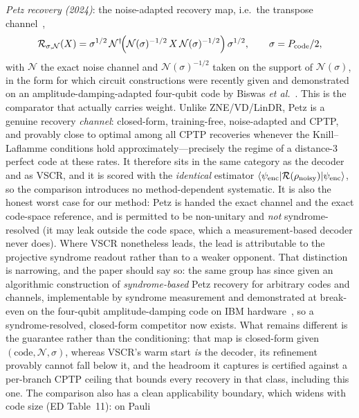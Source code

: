 \documentclass[aps,prxquantum,reprint,superscriptaddress]{revtex4-2}
\newcommand{\ket}[1]{\lvert #1\rangle}
\newcommand{\bra}[1]{\langle #1\rvert}
\begin{document}
\emph{Petz recovery (2024)}: the noise-adapted recovery map, i.e.\ the transpose
channel~\cite{petz_map,beny_optimal},
\begin{equation}
\mathcal{R}_{\sigma,\mathcal N}(X)=\sigma^{1/2}\,
\mathcal N^\dagger\!\Big(\mathcal N(\sigma)^{-1/2}\,X\,
\mathcal N(\sigma)^{-1/2}\Big)\,\sigma^{1/2},
\qquad \sigma=P_{\rm code}/2,
\label{eq:petz}
\end{equation}
with $\mathcal N$ the exact noise channel and $\mathcal N(\sigma)^{-1/2}$ taken on
the support of $\mathcal N(\sigma)$, in the form for which circuit constructions
were recently given and demonstrated on an amplitude-damping-adapted four-qubit
code by Biswas \emph{et al.}~\cite{biswas_petz}. This is the comparator that
actually carries weight. Unlike ZNE/VD/LinDR, Petz is a genuine recovery
\emph{channel}: closed-form, training-free, noise-adapted and CPTP, and
provably close to optimal among all CPTP recoveries whenever the
Knill--Laflamme conditions hold approximately---precisely the regime of a
distance-$3$ perfect code at these rates. It therefore sits in the same category
as the decoder and as VSCR, and it is scored with the \emph{identical} estimator
$\bra{\psi_{\rm enc}}\mathcal R(\rho_{\rm noisy})\ket{\psi_{\rm enc}}$, so the
comparison introduces no method-dependent systematic. It is also the honest worst
case for our method: Petz is handed the exact channel and the exact code-space
reference, and is permitted to be non-unitary and \emph{not} syndrome-resolved
(it may leak outside the code space, which a measurement-based decoder never
does). Where VSCR nonetheless leads, the lead is attributable to the projective
syndrome readout rather than to a weaker opponent. That distinction is narrowing,
and the paper should say so: the same group has since given an algorithmic
construction of \emph{syndrome-based} Petz recovery for arbitrary codes and
channels, implementable by syndrome measurement and demonstrated at break-even on
the four-qubit amplitude-damping code on IBM
hardware~\cite{biswas_syndrome_petz}, so a syndrome-resolved, closed-form
competitor now exists. What remains different is the guarantee rather than the
conditioning: that map is closed-form given $(\mathrm{code},\mathcal N,\sigma)$,
whereas VSCR's warm start \emph{is} the decoder, its refinement provably cannot
fall below it, and the headroom it captures is certified against a per-branch
CPTP ceiling that bounds every recovery in that class, including this one. The
comparison also has a
clean applicability boundary, which widens with code size (ED Table~11): on Pauli
\end{document}

